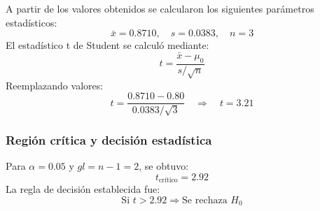 \begin{table}[H]
\centering
\caption{Indicadores globales utilizados para la validación de la hipótesis general (Enfoque en el Estudiante)}
\label{tab:metricas_hipotesis_general}
\footnotesize
\renewcommand{\arraystretch}{1.4}

\end{table}

\vspace{0.4cm}

A partir de los valores obtenidos se calcularon los siguientes parámetros estadísticos:
\[
\bar{x} = 0.8710,\quad s = 0.0383,\quad n = 3
\]
El estadístico t de Student se calculó mediante:
\[
t = \frac{\bar{x} - \mu_0}{s / \sqrt{n}}
\]
Reemplazando valores:
\[
t = \frac{0.8710 - 0.80}{0.0383 / \sqrt{3}} \quad \Rightarrow \quad t = 3.21
\]

\vspace{0.4cm}

\subsubsection{Región crítica y decisión estadística}
Para \(\alpha = 0.05\) y \(gl = n-1 = 2\), se obtuvo:
\[
t_{\text{crítico}} = 2.92
\]
La regla de decisión establecida fue:
\[
\text{Si } t > 2.92 \Rightarrow \text{Se rechaza } H_0
\]

\vspace{0.4cm}

